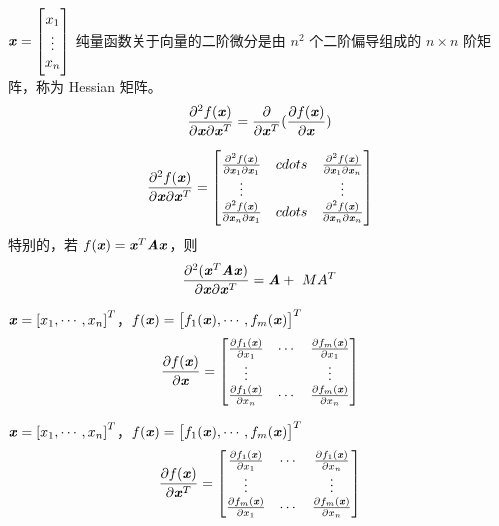 \begin{definition}
    $\vxx$
    纯量函数关于向量的二阶微分是由 $n^2$ 个二阶偏导组成的 $n \times n$ 阶矩阵，称为 Hessian 矩阵。
    \[
        \frac{\partial^2 f(\Vx)}{\partial \Vx \partial \Vx^T} = \frac{\partial}{\partial \Vx^T} (\frac{\partial f(\Vx)}{\partial \Vx})
    \]

    \[
        \frac{\partial^2 f(\Vx)}{\partial \Vx \partial \Vx^T} =
        \begin{bmatrix}
            \frac{\partial^2 f(\Vx)}{\partial \Vx_1 \partial \Vx_1}    & cdots &     \frac{\partial^2 f(\Vx)}{\partial \Vx_1 \partial \Vx_n}    \\
            \vdots & & \vdots \\
            \frac{\partial^2 f(\Vx)}{\partial \Vx_n \partial \Vx_1}    & cdots &     \frac{\partial^2 f(\Vx)}{\partial \Vx_n \partial \Vx_n}
        \end{bmatrix}
    \]
    特别的，若 $f(\Vx) = \Vx^T \MA \Vx$，则
    \[
        \frac{\partial^2 (\Vx^T \MA \Vx)}{\partial \Vx \partial \Vx^T} = \MA +\ MA^T
    \]
\end{definition}


\begin{definition}
    $\Vx = \left[x_1, \cdots, x_n \right]^T$，$f(\Vx) = \left[f_1(\Vx), \cdots, f_m(\Vx) \right]^T$
    \[
        \frac{\partial f(\Vx)}{\partial \Vx} = \begin{bmatrix}
            \frac{\partial f_1(\Vx)}{\partial x_1}  & \cdots & \frac{\partial f_m(\Vx)}{\partial x_1} \\
            \vdots & & \vdots \\
            \frac{\partial f_1(\Vx)}{\partial x_n}  & \cdots & \frac{\partial f_m(\Vx)}{\partial x_n}
        \end{bmatrix}
    \]
\end{definition}

\begin{definition}[Jacobi矩阵]
    $\Vx = \left[x_1, \cdots, x_n \right]^T$，$f(\Vx) = \left[f_1(\Vx), \cdots, f_m(\Vx) \right]^T$
    \[
        \frac{\partial f(\Vx)}{\partial \Vx^T} = \begin{bmatrix}
            \frac{\partial f_1(\Vx)}{\partial x_1}  & \cdots & \frac{\partial f_1(\Vx)}{\partial x_n} \\
            \vdots & & \vdots \\
            \frac{\partial f_m(\Vx)}{\partial x_1}  & \cdots & \frac{\partial f_m(\Vx)}{\partial x_n}
        \end{bmatrix}
    \]
\end{definition}


